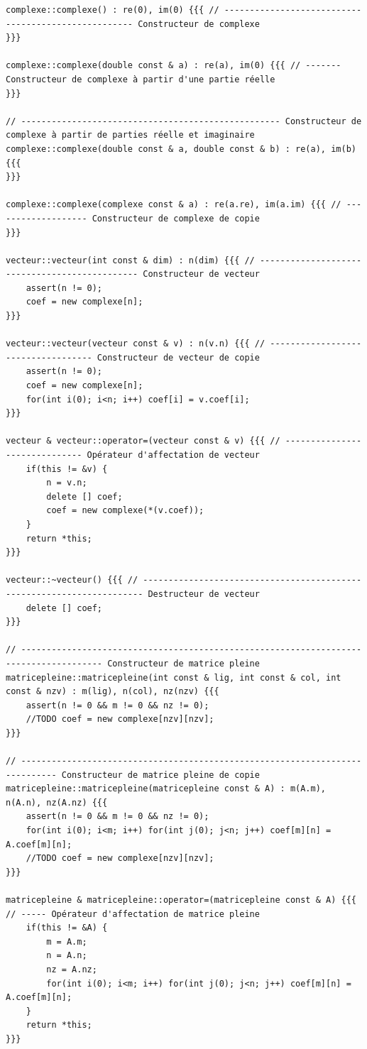 \documentclass[a4paper]{article}
\begin{document}
\begin{verbatim}
complexe::complexe() : re(0), im(0) {{{ // ---------------------------------------------------- Constructeur de complexe
}}}

complexe::complexe(double const & a) : re(a), im(0) {{{ // ------- Constructeur de complexe à partir d'une partie réelle
}}}

// --------------------------------------------------- Constructeur de complexe à partir de parties réelle et imaginaire
complexe::complexe(double const & a, double const & b) : re(a), im(b) {{{ 
}}}

complexe::complexe(complexe const & a) : re(a.re), im(a.im) {{{ // ------------------- Constructeur de complexe de copie
}}}

vecteur::vecteur(int const & dim) : n(dim) {{{ // ---------------------------------------------- Constructeur de vecteur
    assert(n != 0);
    coef = new complexe[n];
}}}

vecteur::vecteur(vecteur const & v) : n(v.n) {{{ // ----------------------------------- Constructeur de vecteur de copie
    assert(n != 0);
    coef = new complexe[n];
    for(int i(0); i<n; i++) coef[i] = v.coef[i];
}}}

vecteur & vecteur::operator=(vecteur const & v) {{{ // ------------------------------ Opérateur d'affectation de vecteur
    if(this != &v) {
        n = v.n;
        delete [] coef;
        coef = new complexe(*(v.coef));
    }
    return *this;
}}}

vecteur::~vecteur() {{{ // ---------------------------------------------------------------------- Destructeur de vecteur
    delete [] coef;
}}}

// -------------------------------------------------------------------------------------- Constructeur de matrice pleine
matricepleine::matricepleine(int const & lig, int const & col, int const & nzv) : m(lig), n(col), nz(nzv) {{{ 
    assert(n != 0 && m != 0 && nz != 0);
    //TODO coef = new complexe[nzv][nzv];
}}}

// ----------------------------------------------------------------------------- Constructeur de matrice pleine de copie
matricepleine::matricepleine(matricepleine const & A) : m(A.m), n(A.n), nz(A.nz) {{{ 
    assert(n != 0 && m != 0 && nz != 0);
    for(int i(0); i<m; i++) for(int j(0); j<n; j++) coef[m][n] = A.coef[m][n];
    //TODO coef = new complexe[nzv][nzv];
}}}

matricepleine & matricepleine::operator=(matricepleine const & A) {{{ // ----- Opérateur d'affectation de matrice pleine
    if(this != &A) {
        m = A.m;
        n = A.n;
        nz = A.nz;
        for(int i(0); i<m; i++) for(int j(0); j<n; j++) coef[m][n] = A.coef[m][n];
    }
    return *this;
}}}


\end{verbatim}
\end{document}

